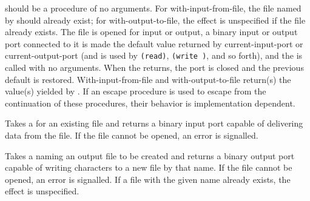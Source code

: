 \begin{entry}{%
}

 should be a procedure of no arguments.
For {\cf with-input-from-file},
the file named by  should already exist; for
{\cf with-output-to-file},
the effect is unspecified if the file
already exists.
The file is opened for input or output, a binary input or output port
connected to it is made the default value returned by
{\cf current-input-port} or {\cf current-output-port}
(and is used by {\tt (read)}, {\tt (write )}, and so forth),
and the
 is called with no arguments.  When the  returns,
the port is closed and the previous default is restored.
{\cf With-input-from-file} and {\cf with-output-to-file} return(s) the
value(s) yielded by .
If an escape procedure
is used to escape from the continuation of these procedures, their
behavior is implementation dependent.




\end{entry}


\begin{entry}{%
}
 
Takes a  for an existing file and returns a binary input
port capable of delivering data from the file.  If the file cannot be
opened, an error is signalled.

\end{entry}


\begin{entry}{%
}

Takes a  naming an output file to be created and returns
a binary output port capable of writing characters to a new file by
that name.  If the file cannot be opened, an error is signalled.  If a
file with the given name already exists, the effect is unspecified.

\end{entry}


